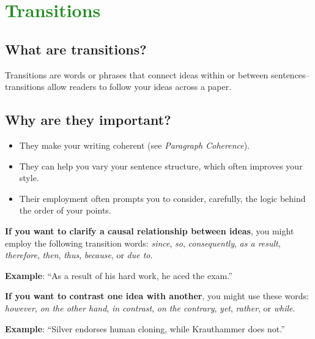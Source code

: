 

\section{\textcolor{ForestGreen}{Transitions}}

\subsection {What are transitions?}

Transitions are words or phrases that connect ideas within or between sentences--transitions allow readers to follow your ideas across a paper.

\subsection{Why are they important?}

\begin{itemize}
\item They make your writing coherent (see \emph{Paragraph Coherence}). 

\item They can help you vary your sentence structure, which often improves your style.

\item Their employment often prompts you to consider, carefully, the logic behind the order of your points.

\end{itemize}
         

\textbf{If you want to clarify a causal relationship between ideas}, you might employ the following transition words: \emph{since}, \emph{so}, \emph{consequently}, \emph{as a result}, \emph{therefore}, \emph{then}, \emph{thus}, \emph{because}, or \emph{due to}.
 
 \tab \textbf{Example}: ``As a result of his hard work, he aced the exam.''

\textbf{If you want to contrast one idea with another}, you might use these words: \emph{however}, \emph{on the other hand}, \emph{in contrast}, \emph{on the contrary}, \emph{yet}, \emph{rather}, or \emph{while}.

\tab \textbf{Example}: ``Silver endorses human cloning, while Krauthammer does not.''

